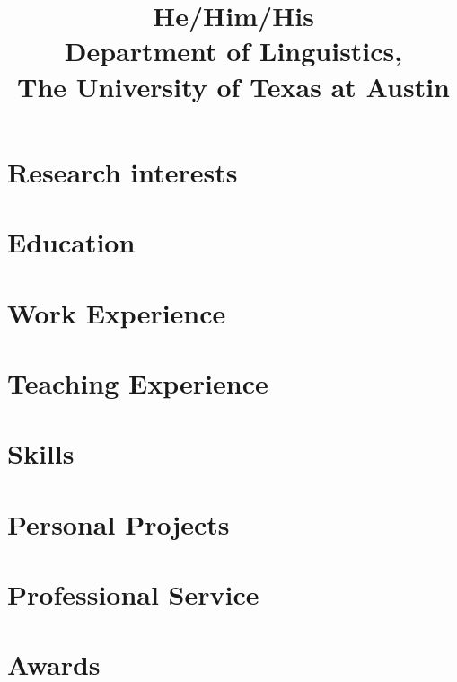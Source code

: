 \documentclass[11pt,a4paper]{mycv}
\title{He/Him/His\\Department of Linguistics,\\The University of Texas at Austin}
\begin{document}
\makecvtitle

\section{Research interests}


\section{Education}


\section{Work Experience}


\begingroup
\setlength\bibitemsep{0.5ex}
\printbibliography[title=Papers, nottype=unpublished]
\endgroup

\begingroup
\setlength\bibitemsep{0.5ex}
\printbibliography[title=Talks, type=unpublished]
\endgroup

\section{Teaching Experience}


\section{Skills}


\section{Personal Projects}


\section{Professional Service}


\section{Awards}

\end{document}
